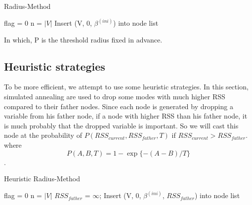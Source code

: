 \documentclass[12pt]{article}
\theoremstyle{definition}
\begin{document}
\IncMargin{1em}
\begin{algorithm}
\SetAlgoLined
\caption{Radius-Method}
\BlankLine
flag = 0\;
n = $|V|$\;
Insert (V, 0, $\beta^{(ini)}$) into node list\;
\end{algorithm}\DecMargin{1em}
In which, P is the threshold radius fixed in advance.
\newpage
\subsection{Heuristic strategies}
To be more efficient, we attempt to use some heuristic strategies. In this section, simulated annealing are used to drop some modes with much higher RSS compared to their father nodes. Since each node is generated by dropping a variable from his father node, if a node with higher RSS than his father node, it is much probably that the dropped variable is important. So we will cast this node at the probability of $P(RSS_{current}, RSS_{father}, T)$ if $RSS_{current} > RSS_{father}$.
where
$$P(A, B, T) = 1-\exp\{-(A-B)/T\}$$.

\IncMargin{1em}
\begin{algorithm}
\SetAlgoLined
\caption{Heuristic Radius-Method}
\BlankLine
flag = 0\;
n = $|V|$\;
$RSS_{father}$ = $\infty$;
Insert (V, 0, $\beta^{(ini)}$, $RSS_{father}$) into node list\;
\end{algorithm}\DecMargin{1em}
\end{document}
